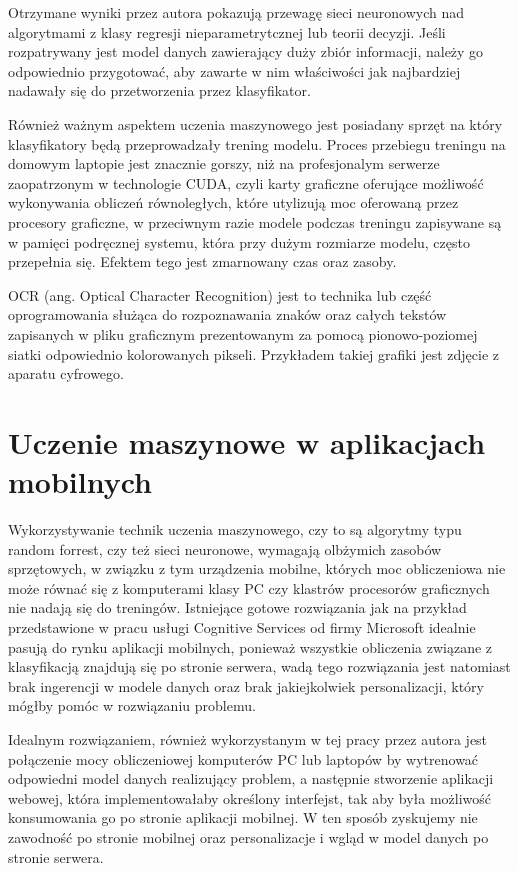 \documentclass[brudnopis]{xmgr}
\begin{document}
Otrzymane wyniki przez autora pokazują przewagę sieci neuronowych nad algorytmami z klasy regresji nieparametrytcznej lub teorii decyzji. Jeśli rozpatrywany jest model danych zawierający duży zbiór informacji, należy go odpowiednio przygotować, aby zawarte w nim właściwości jak najbardziej nadawały się do przetworzenia przez klasyfikator. 

Również ważnym aspektem uczenia maszynowego jest posiadany sprzęt na który klasyfikatory będą przeprowadzały trening modelu. Proces przebiegu treningu na domowym laptopie jest znacznie gorszy, niż na profesjonalym serwerze zaopatrzonym w technologie CUDA, czyli karty graficzne oferujące możliwość wykonywania obliczeń równoległych, które utylizują moc oferowaną przez procesory graficzne, w przeciwnym razie modele podczas treningu zapisywane są w pamięci podręcznej systemu, która przy dużym rozmiarze modelu, często przepełnia się. Efektem tego jest zmarnowany czas oraz zasoby.

OCR (ang. Optical Character Recognition) jest to technika lub część oprogramowania służąca do rozpoznawania znaków oraz całych tekstów zapisanych w pliku graficznym prezentowanym za pomocą pionowo-poziomej siatki odpowiednio kolorowanych pikseli. Przykładem takiej grafiki jest zdjęcie z aparatu cyfrowego.

\section{Uczenie maszynowe w aplikacjach mobilnych}

Wykorzystywanie technik uczenia maszynowego, czy to są algorytmy typu random forrest, czy też sieci neuronowe, wymagają olbżymich zasobów sprzętowych, w związku z tym urządzenia mobilne, których moc obliczeniowa nie może równać się z komputerami klasy PC czy klastrów procesorów graficznych nie nadają się do treningów. Istniejące gotowe rozwiązania jak na przykład przedstawione w pracu usługi Cognitive Services od firmy Microsoft idealnie pasują do rynku aplikacji mobilnych, ponieważ wszystkie obliczenia związane z klasyfikacją znajdują się po stronie serwera, wadą tego rozwiązania jest natomiast brak ingerencji w modele danych oraz brak jakiejkolwiek personalizacji, który mógłby pomóc w rozwiązaniu problemu.

Idealnym rozwiązaniem, również wykorzystanym w tej pracy przez autora jest połączenie mocy obliczeniowej komputerów PC lub laptopów by wytrenować odpowiedni model danych realizujący problem, a następnie stworzenie aplikacji webowej, która implementowałaby określony interfejst, tak aby była możliwość konsumowania go po stronie aplikacji mobilnej. W ten sposób zyskujemy nie zawodność po stronie mobilnej oraz personalizacje i wgląd w model danych po stronie serwera.
\end{document}
